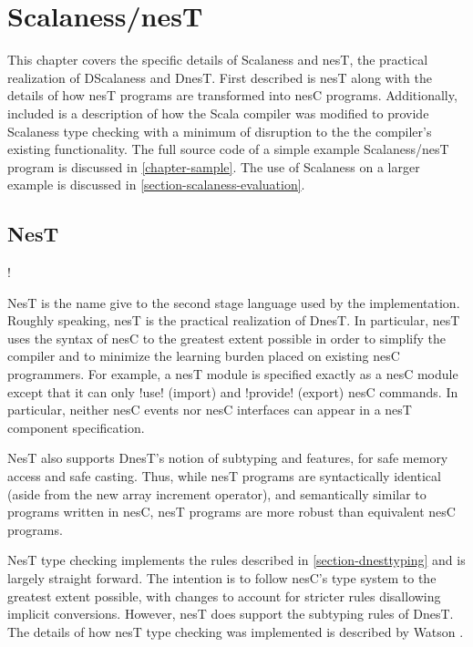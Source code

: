 \chapter{Scalaness/nesT}
\label{chapter-scalaness-nest}

This chapter covers the specific details of Scalaness and nesT, the practical realization of
DScalaness and DnesT. First described is nesT along with the details of how nesT programs are
transformed into nesC programs. Additionally, included is a description of how the Scala
compiler was modified to provide Scalaness type checking with a minimum of disruption to the the
compiler's existing functionality. The full source code of a simple example Scalaness/nesT
program is discussed in \autoref{chapter-sample}. The use of Scalaness on a larger example is
discussed in \autoref{section-scalaness-evaluation}.

\section{NesT}
\label{section-nest-implementation}

\lstset{language=nesC}
\lstMakeShortInline!

NesT is the name give to the second stage language used by the implementation. Roughly speaking,
nesT is the practical realization of DnesT. In particular, nesT uses the syntax of nesC to the
greatest extent possible in order to simplify the compiler and to minimize the learning burden
placed on existing nesC programmers. For example, a nesT module is specified exactly as a nesC
module except that it can only !use! (import) and !provide! (export) nesC commands. In
particular, neither nesC events nor nesC interfaces can appear in a nesT component specification.

NesT also supports DnesT's notion of subtyping and features, for safe memory access and safe
casting. Thus, while nesT programs are syntactically identical (aside from the new array
increment operator), and semantically similar to programs written in nesC, nesT programs are
more robust than equivalent nesC programs.

NesT type checking implements the rules described in \autoref{section-dnesttyping} and is
largely straight forward. The intention is to follow nesC's type system to the greatest extent
possible, with changes to account for stricter rules disallowing implicit conversions. However,
nesT does support the subtyping rules of DnesT. The details of how nesT type checking was
implemented is described by Watson \cite{watson-masters-2013}.

